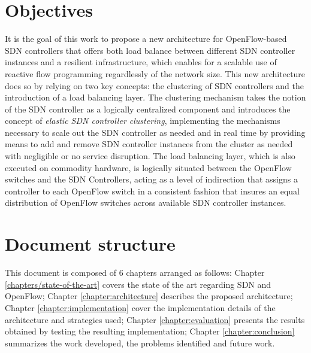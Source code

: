 \section{Objectives}
It is the goal of this work to propose a new architecture for OpenFlow-based \gls{SDN} controllers that offers both load balance between different \gls{SDN} controller instances and a resilient infrastructure, which enables for a scalable use of reactive flow programming regardlessly of the network size.
This new architecture does so by relying on two key concepts: the clustering of \gls{SDN} controllers and the introduction of a load balancing layer.
The clustering mechanism takes the notion of the \gls{SDN} controller as a logically centralized component and introduces the concept of \emph{elastic \gls{SDN} controller clustering}, implementing the mechanisms necessary to scale out the \gls{SDN} controller as needed and in real time by providing means to add and remove \gls{SDN} controller instances from the cluster as needed with negligible or no service disruption.
The load balancing layer, which is also executed on commodity hardware, is logically situated between the OpenFlow switches and the SDN Controllers, acting as a level of indirection that assigns a controller to each OpenFlow switch in a consistent fashion that insures an equal distribution of OpenFlow switches across available SDN controller instances.\\
%
\section{Document structure}
This document is composed of 6 chapters arranged as follows: Chapter \ref{chapters/state-of-the-art} covers the state of the art regarding \gls{SDN} and OpenFlow; Chapter \ref{chapter:architecture} describes the proposed architecture; Chapter \ref{chapter:implementation} cover the implementation details of the architecture and strategies used; Chapter \ref{chapter:evaluation} presents the results obtained by testing the resulting implementation; Chapter \ref{chapter:conclusion} summarizes the work developed, the problems identified and future work.